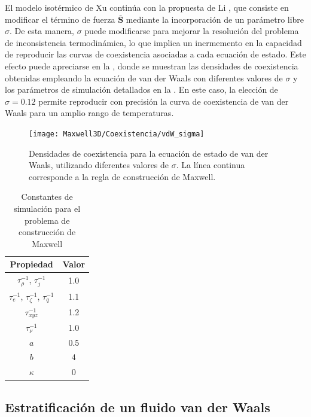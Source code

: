 \FloatBarrier

El modelo isot\'ermico de Xu contin\'ua con la propuesta de Li \cite{li_forcing_2012}, que consiste en modificar el t\'ermino de fuerza $\bar{\bm{S}}$ mediante la incorporaci\'on de un par\'ametro libre $\sigma$. De esta manera, $\sigma$ puede modificarse para mejorar la resoluci\'on del problema de inconsistencia termodin\'amica, lo que implica un incrmemento en la capacidad de reproducir las curvas de coexistencia asociadas a cada ecuaci\'on de estado. Este efecto puede apreciarse en la , donde se muestran las densidades de coexistencia obtenidas empleando la ecuaci\'on de van der Waals con diferentes valores de $\sigma$ y los par\'ametros de simulaci\'on detallados en la . En este caso, la elecci\'on de $\sigma=0.12$ permite reproducir con precisi\'on la curva de coexistencia de van der Waals para un amplio rango de temperaturas.

\begin{figure}[ht]
	\centering
	\texttt{[image: Maxwell3D/Coexistencia/vdW\_sigma]}
	\caption{Densidades de coexistencia para la ecuaci\'on de estado de van der Waals, utilizando diferentes valores de $\sigma$. La l\'inea continua corresponde a la regla de construcci\'on de Maxwell.}
	\label{fig:vdW_coex_3D}
\end{figure}

\begin{table}[ht]
	\centering
    \begin{tabular}{c c}
	    \toprule
        \bf Propiedad & \bf Valor \\
        \midrule
        $\tau_{\rho}^{-1}$, $\tau_{j}^{-1}$ & 1.0\\
        $\tau_{e}^{-1}$, $\tau_{\zeta}^{-1}$, $\tau_{q}^{-1}$ & 1.1 \\
        $\tau_{xyz}^{-1}$ & 1.2 \\        
        $\tau_{\nu}^{-1}$ & 1.0 \\
		$a$ & 0.5 \\
		$b$ & 4 \\        
        $\kappa$ & 0 \\
        \bottomrule
	\end{tabular}
	\caption{Constantes de simulaci\'on para el problema de construcci\'on de Maxwell}
	\label{tab:mx3D_prop}
\end{table}  




\subsection{Estratificaci\'on de un fluido van der Waals}

